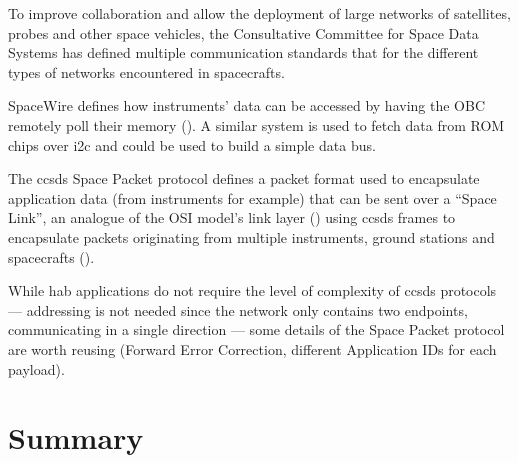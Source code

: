 To improve collaboration and allow the deployment of large networks of
satellites, probes and other space vehicles, the Consultative Committee for
Space Data Systems has defined multiple communication standards that for
the different types of networks encountered in spacecrafts.

SpaceWire defines how instruments' data can be accessed by having the OBC
remotely poll their memory (\cite{parkes2005}). A similar system is used to
fetch data from ROM chips over \acrshort{i2c} and could be used to build a
simple data bus.

The \acrshort{ccsds} Space Packet protocol defines a packet format used to
encapsulate application data (from instruments for example) that can be sent
over a ``Space Link'', an analogue of the OSI model's link layer
(\cite{Stallings1987}) using \acrshort{ccsds} frames to encapsulate packets
originating from multiple instruments, ground stations and spacecrafts
(\cite{ccsds2003}).

While \acrshort{hab} applications do not require the level of complexity of
\acrshort{ccsds} protocols — addressing is not needed since the network only
contains two endpoints, communicating in a single direction — some details of
the Space Packet protocol are worth reusing (Forward Error Correction,
different Application IDs for each payload).

\section{Summary}